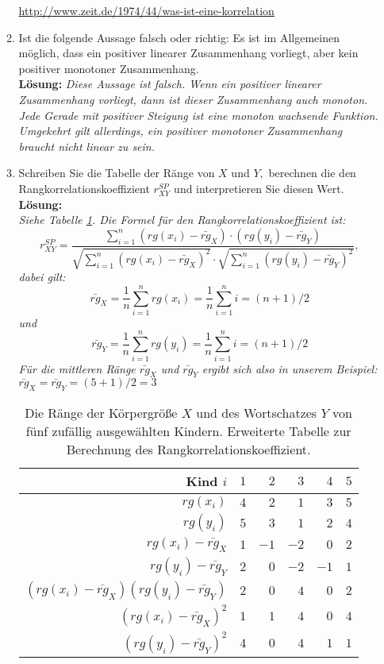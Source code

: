 \documentclass[11pt]{article}
\begin{document}
\begin{enumerate}
\begin{enumerate}
{{\url{http://www.zeit.de/1974/44/was-ist-eine-korrelation}
}
} 
\item{Ist die folgende Aussage falsch oder richtig: Es ist im Allgemeinen möglich,
dass ein positiver linearer Zusammenhang vorliegt, aber kein positiver
monotoner Zusammenhang.\\
\textbf{Lösung:}
\textit{Diese Aussage ist falsch. Wenn ein positiver linearer Zusammenhang vorliegt,
dann ist dieser Zusammenhang auch monoton. Jede Gerade mit positiver 
Steigung ist eine monoton wachsende Funktion. Umgekehrt gilt allerdings,
ein positiver monotoner Zusammenhang braucht nicht linear zu sein. 
}
} 
\item{Schreiben Sie die Tabelle der Ränge von $X$ und $Y,$
berechnen die den Rangkorrelationskoeffizient $r^{SP}_{XY}$ und interpretieren Sie
diesen Wert.\\
\textbf{Lösung:}\\
\textit{Siehe Tabelle \ref{tab2_sol}. 
Die Formel für den Rangkorrelationskoeffizient ist:
\begin{equation}
\label{sp}
r^{SP}_{XY}= 
  \frac{\sum_{i=1}^{n}(rg(x_{i})-\bar{rg}_{X})\cdot(rg(y_{i})-\bar{rg}_{Y})}
  		{\sqrt{ \sum_{i=1}^{n} (rg(x_{i})-\bar{rg}_{X})^2}\cdot 
  		\sqrt{ \sum_{i=1}^{n}(rg(y_{i})-\bar{rg}_{Y})^2}},
\end{equation}
dabei gilt:
$$
\bar{rg}_{X}=\frac{1}{n} \sum_{i=1}^{n} rg(x_{i}) = \frac{1}{n} \sum_{i=1}^{n} i = (n+1)/2
$$
und 
$$
\bar{rg}_{Y}=\frac{1}{n} \sum_{i=1}^{n} rg(y_{i}) = \frac{1}{n} \sum_{i=1}^{n} i = (n+1)/2
$$
Für die mittleren Ränge $\bar{rg}_{X}$ und $\bar{rg}_{Y}$ ergibt sich also in unserem Beispiel:
$\bar{rg}_{X}=\bar{rg}_{Y}=(5+1)/2=3$
}
 \begin{table}[h]
 \centering 
\begin{tabular}{|r|r|r|r|r|r|}
  \hline
  Kind   $i$     &   $1$    & $2$   & $3$   & $4$   & $5$ \\ \hline
   $rg(x_{i})$ & $4$ & $2$ & $1$ & $3$ & $5$  \\ \hline
  $rg(y_{i})$   & $5$& $3$ & $1$&  $2$ & $4$ \\ \hline
   $rg(x_{i})-\bar{rg}_{X}$ & $1$ & $-1$ & $-2$ & $0$ & $2$  \\ \hline
  $rg(y_{i})-\bar{rg}_{Y}$   & $2$& $0$ & $-2$&  $-1$ & $1$ \\ \hline
   $(rg(x_{i})-\bar{rg}_{X})(rg(y_{i})-\bar{rg}_{Y})$   & $2$& $0$ & $4$&  $0$ & $2$ \\ \hline
  $(rg(x_{i})-\bar{rg}_{X})^2$   & $1$ & $1$ & $4$ & $0$ & $4$  \\ \hline
  $(rg(y_{i})-\bar{rg}_{Y})^2$   & $4$& $0$ & $4$&  $1$ & $1$ \\ \hline
  \end{tabular}
 \caption{Die Ränge der Körpergröße   $X$  und  des Wortschatzes $Y$ 
 von fünf
 zufällig ausgewählten Kindern. Erweiterte Tabelle zur Berechnung des Rangkorrelationskoeffizient.
 \label{tab2_sol}}
 \end{table}  
 
}
\end{enumerate}
\end{enumerate}
\end{document}
